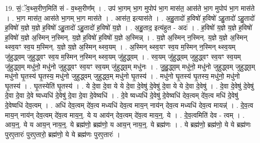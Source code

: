 \documentclass[17pt]{extarticle}
\begin{document}
19. सं॒ॅव॒थ्स॒रीण॒मिति॑ सं - व॒थ्स॒रीण᳚म् । . उप॑ भा॒गम् भा॒ग मुपोप॑ भा॒ग मास॑त॒ आस॑ते भा॒ग मुपोप॑ भा॒ग मास॑ते । . भा॒ग मास॑त॒ आस॑ते भा॒गम् भा॒ग मास॑ते । . आस॑त॒ इत्यास॑ते । . अ॒हु॒तादो॑ ह॒विषो॑ ह॒विषो॑ ऽहु॒तादो॑ ऽहु॒तादो॑ ह॒विषो॑ य॒ज्ञे य॒ज्ञे ह॒विषो॑ ऽहु॒तादो॑ ऽहु॒तादो॑ ह॒विषो॑ य॒ज्ञे । . अ॒हु॒ताद॒ इत्य॑हुत - अदः॑ । . ह॒विषो॑ य॒ज्ञे य॒ज्ञे ह॒विषो॑ ह॒विषो॑ य॒ज्ञे अ॒स्मिन् न॒स्मिन्. य॒ज्ञे ह॒विषो॑ ह॒विषो॑ य॒ज्ञे अ॒स्मिन्न् । . य॒ज्ञे अ॒स्मिन् न॒स्मिन्. य॒ज्ञे य॒ज्ञे अ॒स्मिन् थ्स्व॒यꣳ स्व॒य म॒स्मिन्. य॒ज्ञे य॒ज्ञे अ॒स्मिन् थ्स्व॒यम् । . अ॒स्मिन् थ्स्व॒यꣳ स्व॒य म॒स्मिन् न॒स्मिन् थ्स्व॒यम् जु॑हुद्ध्वम् जुहुद्ध्वꣳ स्व॒य म॒स्मिन् न॒स्मिन् थ्स्व॒यम् जु॑हुद्ध्वम् । . स्व॒यम् जु॑हुद्ध्वम् जुहुद्ध्वꣳ स्व॒यꣳ स्व॒यम् जु॑हुद्ध्व॒म् मधु॑नो॒ मधु॑नो जुहुद्ध्वꣳ स्व॒यꣳ स्व॒यम् जु॑हुद्ध्व॒म् मधु॑नः । . जु॒हु॒द्ध्व॒म् मधु॑नो॒ मधु॑नो जुहुद्ध्वम् जुहुद्ध्व॒म् मधु॑नो घृ॒तस्य॑ घृ॒तस्य॒ मधु॑नो जुहुद्ध्वम् जुहुद्ध्व॒म् मधु॑नो घृ॒तस्य॑ । . मधु॑नो घृ॒तस्य॑ घृ॒तस्य॒ मधु॑नो॒ मधु॑नो घृ॒तस्य॑ । . घृ॒तस्येति॑ घृ॒तस्य॑ । . ये दे॒वा दे॒वा ये ये दे॒वा दे॒वेषु॑ दे॒वेषु॑ दे॒वा ये ये दे॒वा दे॒वेषु॑ । . दे॒वा दे॒वेषु॑ दे॒वेषु॑ दे॒वा दे॒वा दे॒वे ष्वध्यधि॑ दे॒वेषु॑ दे॒वा दे॒वा दे॒वेष्वधि॑ । . दे॒वे ष्वध्यधि॑ दे॒वेषु॑ दे॒वेष्वधि॑ देव॒त्वम् दे॑व॒त्व मधि॑ दे॒वेषु॑ दे॒वेष्वधि॑ देव॒त्वम् । . अधि॑ देव॒त्वम् दे॑व॒त्व मध्यधि॑ देव॒त्व माय॒न् नाय॑न् देव॒त्व मध्यधि॑ देव॒त्व मायन्न्॑ । . दे॒व॒त्व माय॒न् नाय॑न् देव॒त्वम् दे॑व॒त्व माय॒न्॒. ये य आय॑न् देव॒त्वम् दे॑व॒त्व माय॒न्॒. ये । . दे॒व॒त्वमिति॑ देव - त्वम् । . आय॒न्॒. ये य आय॒न् नाय॒न्॒. ये ब्रह्म॑णो॒ ब्रह्म॑णो॒ य आय॒न् नाय॒न्॒. ये ब्रह्म॑णः । . ये ब्रह्म॑णो॒ ब्रह्म॑णो॒ ये ये ब्रह्म॑णः पुरए॒तारः॑ पुरए॒तारो॒ ब्रह्म॑णो॒ ये ये ब्रह्म॑णः पुरए॒तारः॑ । \newline
\end{document}
